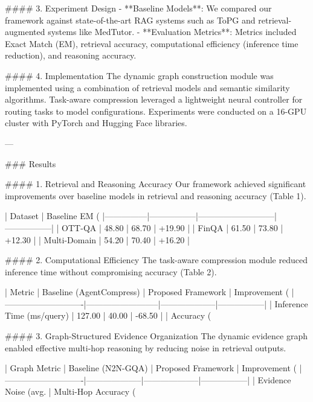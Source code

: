#### 3. Experiment Design
- **Baseline Models**: We compared our framework against state-of-the-art RAG systems such as ToPG and retrieval-augmented systems like MedTutor.
- **Evaluation Metrics**: Metrics included Exact Match (EM), retrieval accuracy, computational efficiency (inference time reduction), and reasoning accuracy.

#### 4. Implementation
The dynamic graph construction module was implemented using a combination of retrieval models and semantic similarity algorithms. Task-aware compression leveraged a lightweight neural controller for routing tasks to model configurations. Experiments were conducted on a 16-GPU cluster with PyTorch and Hugging Face libraries.

---

### Results

#### 1. Retrieval and Reasoning Accuracy
Our framework achieved significant improvements over baseline models in retrieval and reasoning accuracy (Table 1).

| Dataset       | Baseline EM (%
|---------------|-----------------|---------------------------|-----------------|
| OTT-QA        | 48.80           | 68.70                     | +19.90          |
| FinQA         | 61.50           | 73.80                     | +12.30          |
| Multi-Domain  | 54.20           | 70.40                     | +16.20          |

#### 2. Computational Efficiency
The task-aware compression module reduced inference time without compromising accuracy (Table 2).

| Metric                     | Baseline (AgentCompress) | Proposed Framework | Improvement (%
|----------------------------|--------------------------|--------------------|-----------------|
| Inference Time (ms/query)  | 127.00                  | 40.00             | -68.50          |
| Accuracy (%

#### 3. Graph-Structured Evidence Organization
The dynamic evidence graph enabled effective multi-hop reasoning by reducing noise in retrieval outputs.

| Graph Metric               | Baseline (N2N-GQA) | Proposed Framework | Improvement (%
|----------------------------|--------------------|--------------------|-----------------|
| Evidence Noise (avg. %
| Multi-Hop Accuracy (%

